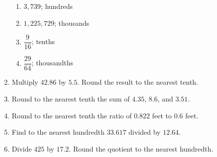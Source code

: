 \documentclass[12pt]{article}
\begin{document}
\begin{enumerate}
\begin{multicols}{2}
\begin{enumerate}
\item \hspace{0.5in} $3,739$; hundreds
  \vspace{0.25in}

\item \hspace{0.5in} $1,225,729$; thousands 
  \vspace{0.25in}

\item \hspace{0.5in} $\dfrac{9}{16}$; tenths
  \vspace{0.25in}

\item \hspace{0.5in} $\dfrac{29}{64}$; thousandths 
  \vspace{0.25in}

\end{enumerate}
\end{multicols}
  \vspace{0.5in}

\newcommand{\spacing}{\vspace{0.50in}}

\item Multiply $42.86$ by $5.5$. Round the result to the nearest tenth. 
\spacing

\item Round to the nearest tenth the sum of $4.35$, $8.6$, and $3.51$. 
\spacing

\item Round to the nearest tenth the ratio of $0.822$ feet to $0.6$ feet.  
\spacing

\item Find to the nearest hundredth $33.617$ divided by $12.64$.  
\spacing

\item Divide $425$ by $17.2$. Round the quotient to the nearest hundredth.   
\spacing

\end{enumerate}
\end{document}

